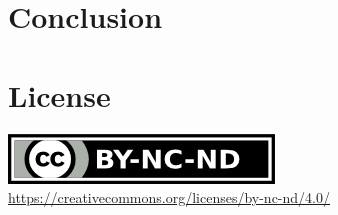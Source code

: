 \documentclass{amsart}
\theoremstyle{definition}
\theoremstyle{remark}
\numberwithin{equation}{section}
\begin{document}
\section{Conclusion}
\label{s:conclusion}
\nocite{*}
%


\section*{License}
\label{s:license}
\begin{center}
	\includegraphics{by-nc-nd.png} \\
	\url{https://creativecommons.org/licenses/by-nc-nd/4.0/}
\end{center}
\end{document}
